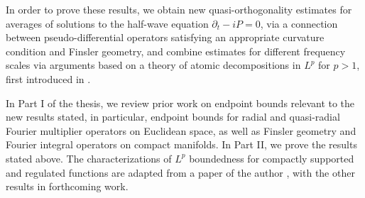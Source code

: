 In order to prove these results, we obtain new quasi-orthogonality estimates for averages of solutions to the half-wave equation $\partial_t - i P = 0$, via a connection between pseudo-differential operators satisfying an appropriate curvature condition and Finsler geometry, and combine estimates for different frequency scales via arguments based on a theory of atomic decompositions in $L^p$ for $p > 1$, first introduced in \cite{SeegerRemarks}.

In Part I of the thesis, we review prior work on endpoint bounds relevant to the new results stated, in particular, endpoint bounds for radial and quasi-radial Fourier multiplier operators on Euclidean space, as well as Finsler geometry and Fourier integral operators on compact manifolds. In Part II, we prove the results stated above. The characterizations of $L^p$ boundedness for compactly supported and regulated functions are adapted from a paper of the author \cite{Denson}, with the other results in forthcoming work.
